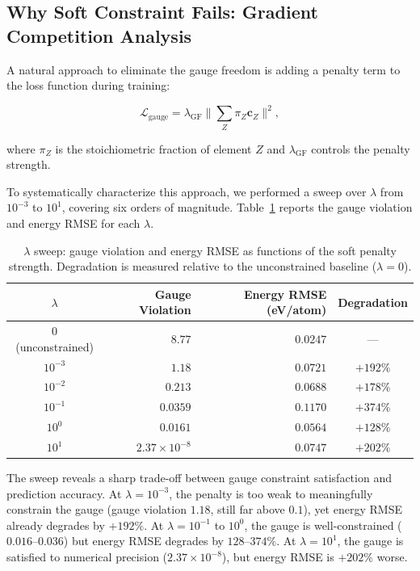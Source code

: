 \documentclass[twoside,prb,aps,floatfix,superscriptaddress,longbibliography]{revtex4-2}
\newcommand{\cZ}{\mathbf{c}_{Z}}
\begin{document}
\subsection{Why Soft Constraint Fails: Gradient Competition Analysis}

A natural approach to eliminate the gauge freedom is adding a penalty term to the loss function during training:

\begin{equation}
\mathcal{L}_{\mathrm{gauge}} = \lambda_{\mathrm{GF}} \Big\lVert \sum_Z \pi_Z \cZ \Big\rVert^2,
\label{eq:soft_gauge}
\end{equation}

where $\pi_Z$ is the stoichiometric fraction of element $Z$ and $\lambda_{\mathrm{GF}}$ controls the penalty strength.

To systematically characterize this approach, we performed a sweep over $\lambda$ from $10^{-3}$ to $10^1$, covering six orders of magnitude. Table~\ref{tab:lambda_sweep} reports the gauge violation and energy RMSE for each $\lambda$.

\begin{table}[t]
\caption{$\lambda$ sweep: gauge violation and energy RMSE as functions of the soft penalty strength. Degradation is measured relative to the unconstrained baseline ($\lambda = 0$).}
\label{tab:lambda_sweep}
\begin{ruledtabular}
\begin{tabular}{crrc}
\toprule
$\lambda$ & Gauge Violation & Energy RMSE (eV/atom) & Degradation \\
\midrule
$0$ (unconstrained) & $8.77$ & $0.0247$ & --- \\
$10^{-3}$ & $1.18$ & $0.0721$ & $+192\%$ \\
$10^{-2}$ & $0.213$ & $0.0688$ & $+178\%$ \\
$10^{-1}$ & $0.0359$ & $0.1170$ & $+374\%$ \\
$10^{0}$ & $0.0161$ & $0.0564$ & $+128\%$ \\
$10^{1}$ & $2.37\times10^{-8}$ & $0.0747$ & $+202\%$ \\
\bottomrule
\end{tabular}
\end{ruledtabular}
\end{table}

The sweep reveals a sharp trade-off between gauge constraint satisfaction and prediction accuracy. At $\lambda = 10^{-3}$, the penalty is too weak to meaningfully constrain the gauge (gauge violation $1.18$, still far above $0.1$), yet energy RMSE already degrades by $+192\%$. At $\lambda = 10^{-1}$ to $10^0$, the gauge is well-constrained ($0.016$--$0.036$) but energy RMSE degrades by $128$--$374\%$. At $\lambda = 10^1$, the gauge is satisfied to numerical precision ($2.37\times10^{-8}$), but energy RMSE is $+202\%$ worse.
\end{document}
